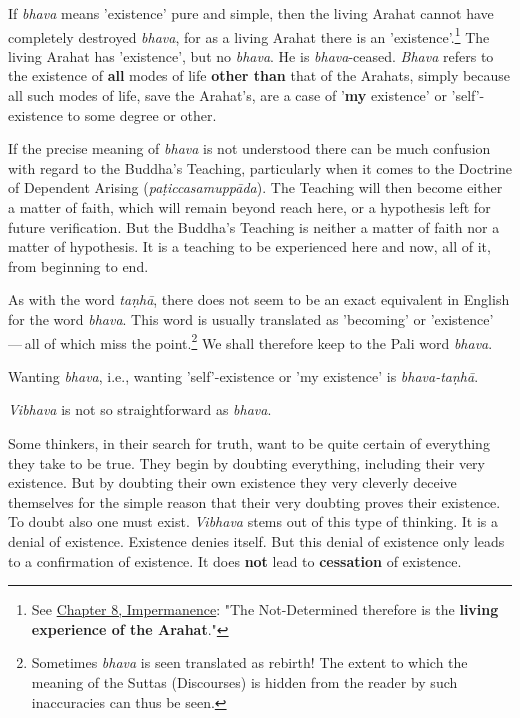 If \emph{bhava} means 'existence' pure and simple, then the living Arahat cannot have completely destroyed \emph{bhava}, for as a living Arahat there is an 'existence'.\footnote{See \href{ch-08-impermanence.xml\#living-experience}{Chapter 8, Impermanence}: "The Not-Determined therefore is the \textbf{living experience of the Arahat}."} The living Arahat has 'existence', but no \emph{bhava}. He is \emph{bhava}-ceased. \emph{Bhava} refers to the existence of \textbf{all} modes of life \textbf{other than} that of the Arahats, simply because all such modes of life, save the Arahat's, are a case of '\textbf{my} existence' or 'self'-existence to some degree or other.

If the precise meaning of \emph{bhava} is not understood there can be much confusion with regard to the Buddha's Teaching, particularly when it comes to the Doctrine of Dependent Arising (\emph{paṭiccasamuppāda}). The Teaching will then become either a matter of faith, which will remain beyond reach here, or a hypothesis left for future verification. But the Buddha's Teaching is neither a matter of faith nor a matter of hypothesis. It is a teaching to be experienced here and now, all of it, from beginning to end.

As with the word \emph{taṇhā}, there does not seem to be an exact equivalent in English for the word \emph{bhava}. This word is usually translated as 'becoming' or 'existence' --- all of which miss the point.\footnote{Sometimes \emph{bhava} is seen translated as rebirth! The extent to which the meaning of the Suttas (Discourses) is hidden from the reader by such inaccuracies can thus be seen.} We shall therefore keep to the Pali word \emph{bhava}.

Wanting \emph{bhava}, i.e., wanting 'self'-existence or 'my existence' is \emph{bhava-taṇhā}.

\emph{Vibhava} is not so straightforward as \emph{bhava}.

Some thinkers, in their search for truth, want to be quite certain of everything they take to be true. They begin by doubting everything, including their very existence. But by doubting their own existence they very cleverly deceive themselves for the simple reason that their very doubting proves their existence. To doubt also one must exist. \emph{Vibhava} stems out of this type of thinking. It is a denial of existence. Existence denies itself. But this denial of existence only leads to a confirmation of existence. It does \textbf{not} lead to \textbf{cessation} of existence.

